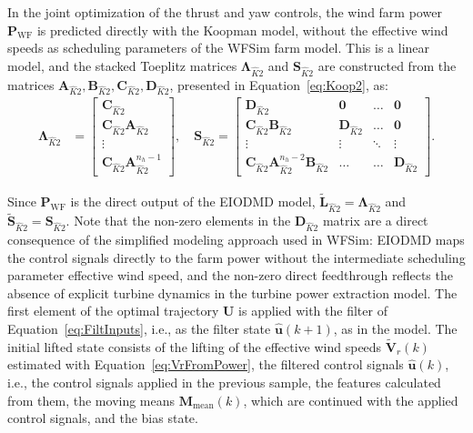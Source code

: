 In the joint optimization of the thrust and yaw controls, the wind farm power $\bm{P}_{\text{WF}}$ is predicted directly with the Koopman model, without the effective wind speeds as scheduling parameters of the WFSim farm model. This is a linear model, and the stacked Toeplitz matrices $\bm{\Lambda}_{\hat{K}2}$ and $\bm{S}_{\hat{K}2}$ are constructed from the matrices $\bm{A}_{\hat{K}2}, \bm{B}_{\hat{K}2}, \bm{C}_{\hat{K}2}, \bm{D}_{\hat{K}2}$, presented in Equation~\eqref{eq:Koop2}, as:
\begin{align*}
    \bm{\Lambda}_{\hat{K}2} &= \begin{bmatrix}
        \bm{C}_{\hat{K}2} \\
        \bm{C}_{\hat{K}2} \bm{A}_{\hat{K}2} \\
        \vdots \\
        \bm{C}_{\hat{K}2} \bm{A}_{\hat{K}2}^{n_h-1}
    \end{bmatrix}, \quad
    \bm{S}_{\hat{K}2} =
    \begin{bmatrix}
        \bm{D}_{\hat{K}2} & \bm{0} & \dots & \bm{0}\\
        \bm{C}_{\hat{K}2} \bm{B}_{\hat{K}2} & \bm{D}_{\hat{K}2} & \dots & \bm{0}\\
        \vdots & \vdots & \ddots & \vdots \\
        \bm{C}_{\hat{K}2} \bm{A}_{\hat{K}2}^{n_h-2} \bm{B}_{\hat{K}2} & \dots & \dots & \bm{D}_{\hat{K}2}
    \end{bmatrix}.
\end{align*}


Since $\bm{P}_{\text{WF}}$ is the direct output of the EIODMD model, $\tilde{\bm{L}}_{\hat{K}2} = \bm{\Lambda}_{\hat{K}2}$ and $\tilde{\bm{S}}_{\hat{K}2} = \bm{S}_{\hat{K}2}$. Note that the non-zero elements in the $\bm{D}_{\hat{K}2}$ matrix are a direct consequence of the simplified modeling approach used in WFSim: EIODMD maps the control signals directly to the farm power without the intermediate scheduling parameter effective wind speed, and the non-zero direct feedthrough reflects the absence of explicit turbine dynamics in the turbine power extraction model. The first element of the optimal trajectory $\bm{U}$ is applied with the filter of Equation~\eqref{eq:FiltInputs}, i.e., as the filter state $\hat{\bm{u}}(k+1)$, as in the model. The initial lifted state consists of the lifting of the effective wind speeds $\tilde{\bm{V}}_r(k)$ estimated with Equation~\eqref{eq:VrFromPower}, the filtered control signals $\hat{\bm{u}}(k)$, i.e., the control signals applied in the previous sample, the features calculated from them, the moving means $\bm{M}_{\text{mean}}(k)$, which are continued with the applied control signals, and the bias state.


